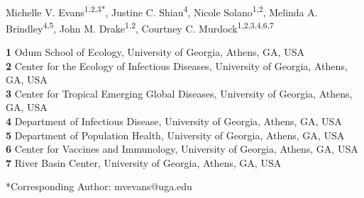 \documentclass[12pt]{article}
\begin{document}
{\Large
\textbf{}}
\\
Michelle V. Evans\textsuperscript{1,2,3*},
Justine C. Shiau\textsuperscript{4},
Nicole Solano\textsuperscript{1,2},
Melinda A. Brindley\textsuperscript{4,5},
John M. Drake\textsuperscript{1,2},
Courtney C. Murdock\textsuperscript{1,2,3,4,6,7}
\\

\hrulefill

\noindent
\textbf{1} Odum School of Ecology, University of Georgia, Athens, GA, USA
\\
\textbf{2} Center for the Ecology of Infectious Diseases, University of Georgia, Athens, GA, USA
\\
\textbf{3} Center for Tropical Emerging Global Diseases, University of Georgia, Athens, GA, USA
\\
\textbf{4} Department of Infectious Disease, University of Georgia, Athens, GA, USA
\\
\textbf{5} Department of Population Health, University of Georgia, Athens, GA, USA
\\
\textbf{6} Center for Vaccines and Immunology, University of Georgia, Athens, GA, USA
\\
\textbf{7} River Basin Center, University of Georgia, Athens, GA, USA
\\
\smallskip

\noindent
*Corresponding Author: mvevans@uga.edu
\bigskip

\hrulefill
\end{document}
